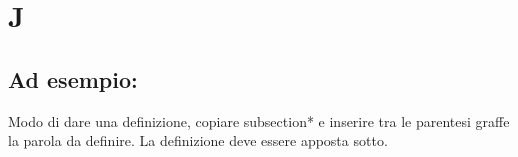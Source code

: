 \section*{J}
\markright{}
\subsection*{Ad esempio:}
Modo di dare una definizione, copiare subsection*{} e inserire tra le parentesi graffe la parola da definire. La definizione deve essere apposta sotto.